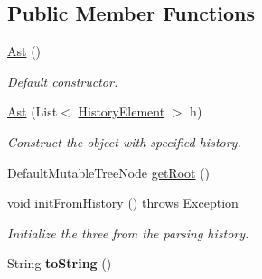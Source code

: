 \subsection*{Public Member Functions}
\begin{DoxyCompactItemize}
\item 
\hypertarget{classparser_program_1_1_ast_ae717a4491faf02f3753ad055eec6d5dd}{\hyperlink{classparser_program_1_1_ast_ae717a4491faf02f3753ad055eec6d5dd}{Ast} ()}\label{classparser_program_1_1_ast_ae717a4491faf02f3753ad055eec6d5dd}

\begin{DoxyCompactList}\small\item\em Default constructor. \end{DoxyCompactList}\item 
\hyperlink{classparser_program_1_1_ast_a0dd9cc520a52069ec8d2bcccf7567799}{Ast} (List$<$ \hyperlink{classparser_program_1_1_history_element}{History\-Element} $>$ h)
\begin{DoxyCompactList}\small\item\em Construct the object with specified history. \end{DoxyCompactList}\item 
Default\-Mutable\-Tree\-Node \hyperlink{classparser_program_1_1_ast_af586bb4da64c79d9259c87757456d685}{get\-Root} ()
\item 
void \hyperlink{classparser_program_1_1_ast_a9ad5f3d77935440489df31131b18bf8e}{init\-From\-History} ()  throws Exception
\begin{DoxyCompactList}\small\item\em Initialize the three from the parsing history. \end{DoxyCompactList}\item 
\hypertarget{classparser_program_1_1_ast_a58d8cf855d692e96d5af5d49a8bca4b9}{String {\bfseries to\-String} ()}\label{classparser_program_1_1_ast_a58d8cf855d692e96d5af5d49a8bca4b9}

\end{DoxyCompactItemize}
